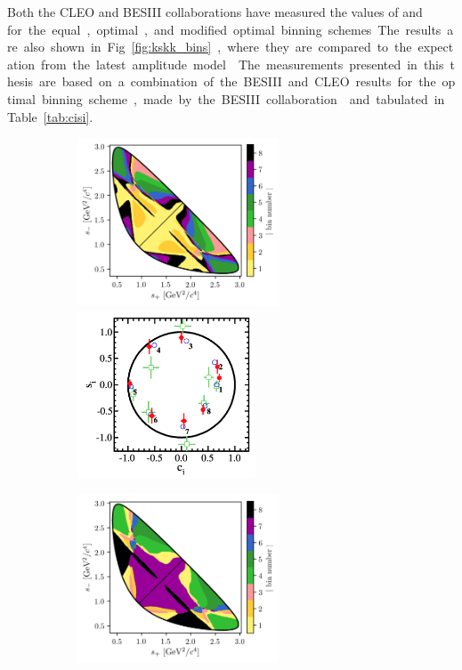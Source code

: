 Both the CLEO and BESIII collaborations have measured the values of \ci and \si for the equal, optimal, and modified optimal binning schemes. The results are also shown in Fig.~\ref{fig:kskk_bins}, where they are  compared to the expectation from the latest amplitude model~\cite{Belle2018}. The measurements presented in this thesis are based on a combination of the BESIII and CLEO results for the optimal binning scheme, made by the BESIII collaboration~\cite{BESCISI} and tabulated in Table~\ref{tab:cisi}. 

\begin{figure}[p]
    \centering
    \begin{subfigure}{\columnwidth}
        \centering
        \includegraphics[height=5cm]{figures/theory/binnings/KsPiPi_equal.png}
        \includegraphics[height=5cm]{figures/theory/cisi_equal.png}
        \caption{}
        \label{fig:kspipi_bins_equal}
    \end{subfigure}
    \begin{subfigure}{\columnwidth}
        \centering
        \includegraphics[height=5cm]{figures/theory/binnings/KsPiPi_optimal.png}

\end{subfigure}
\end{figure}
